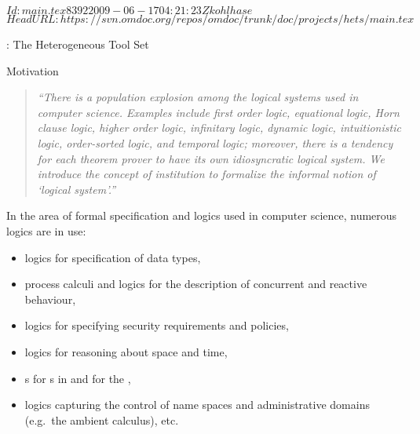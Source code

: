 \svnInfo $Id: main.tex 8392 2009-06-17 04:21:23Z kohlhase $
\svnKeyword $HeadURL: https://svn.omdoc.org/repos/omdoc/trunk/doc/projects/hets/main.tex $

\begin{omgroup}[short=\hets,
   creators={mossakowski,maeder,luettich}]
   {\hets: The Heterogeneous Tool Set}


\begin{omgroup}{Motivation}

\begin{quote}\sl\small
  ``There is a population explosion among the logical systems used in computer
  science. Examples include first order logic, equational logic, Horn clause logic, higher
  order logic, infinitary logic, dynamic logic, intuitionistic logic, order-sorted logic,
  and temporal logic; moreover, there is a tendency for each theorem prover to have its
  own idiosyncratic logical system. We introduce the concept of \emph{institution} to
  formalize the informal notion of `logical system'.''~\cite{GoguenBurstall92}
\end{quote}

In the area of formal specification and logics used in computer
science, numerous logics are in use:
\begin{itemize}
\item logics for specification of data types,
\item process calculi and logics for the description of concurrent
  and reactive behaviour,
\item logics for specifying security requirements and policies,
\item logics for reasoning about space and time,
\item {s} for {s} in
  {} and for the {},
\item logics capturing the control of name spaces and administrative domains (e.g.\ the
  ambient calculus), etc.
\end{itemize}


\end{omgroup}
\end{omgroup}
